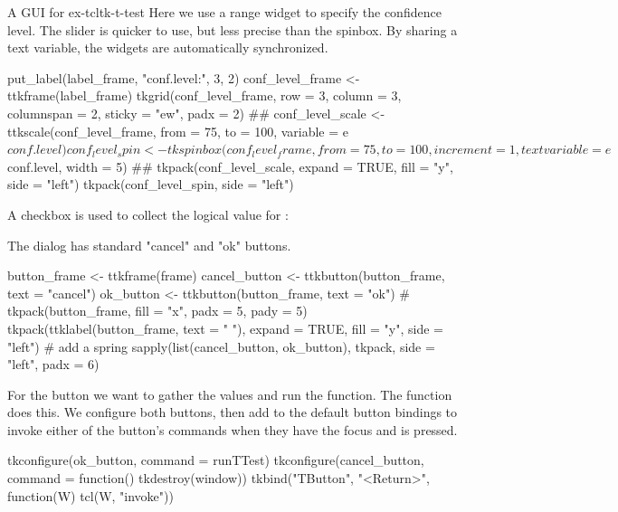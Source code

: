 \begin{example}{A GUI for }{ex-tcltk-t-test}
Here we use a range widget to specify the confidence level. The slider
is quicker to use, but less precise than the spinbox. By sharing a
text variable, the widgets are automatically synchronized.
\begin{Schunk}
\begin{Sinput}
 put_label(label_frame, "conf.level:", 3, 2)
 conf_level_frame <- ttkframe(label_frame)
 tkgrid(conf_level_frame, row = 3, column = 3, columnspan = 2, 
        sticky = "ew", padx = 2)
 ##
 conf_level_scale <- ttkscale(conf_level_frame, from = 75, to = 100, 
                      variable = e$conf.level)
 conf_level_spin <- tkspinbox(conf_level_frame, from = 75, to = 100, increment = 1, 
                      textvariable = e$conf.level, width = 5)
 ##
 tkpack(conf_level_scale, expand = TRUE, fill = "y", side = "left")
 tkpack(conf_level_spin, side = "left")
\end{Sinput}
\end{Schunk}

A checkbox is used to collect the logical value for :
\begin{Schunk}
\end{Schunk}


The dialog has standard "cancel" and "ok" buttons.
\begin{Schunk}
\begin{Sinput}
 button_frame <- ttkframe(frame)
 cancel_button <- ttkbutton(button_frame, text = "cancel")
 ok_button <- ttkbutton(button_frame, text = "ok")
 #
 tkpack(button_frame, fill = "x", padx = 5, pady = 5)
 tkpack(ttklabel(button_frame, text = " "), expand = TRUE, fill = "y", 
        side = "left")                     # add a spring
 sapply(list(cancel_button, ok_button), tkpack, side = "left", padx = 6)
\end{Sinput}
\end{Schunk}
%

For the  button we want to gather the values and run the
function. The  function does this.  We configure both
buttons, then add to the default button bindings to invoke either of the button's commands
when they have the focus and  is pressed.
\begin{Schunk}
\begin{Sinput}
 tkconfigure(ok_button, command = runTTest)
 tkconfigure(cancel_button, command = function() tkdestroy(window))
 tkbind("TButton", "<Return>", function(W) tcl(W, "invoke"))
\end{Sinput}
\end{Schunk}


\end{example}
